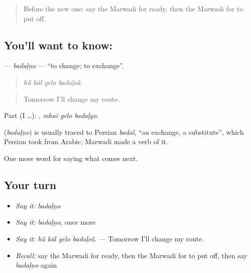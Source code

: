 \label{lesson:MW-C220-badalno}



\begin{quote}
Before the new one: say the Marwadi for ready, then the Marwadi for to put off.
\end{quote}

\subsection*{You'll want to know: }
\textbf{} — \emph{badaḷṇo} — \textquotedblleft{}to change; to exchange\textquotedblright{}.

\begin{quote}
   
\end{quote}

\begin{quote}
\emph{hū̃ kāl gelo badaḷsū̃.}
\end{quote}

\begin{quote}
Tomorrow I'll change my route.
\end{quote}

Past (I …):   , \emph{mhaĩ gelo badaḷyo}.

\begin{cousinweb}
\textbf{} (\emph{badaḷṇo}) is usually traced to Persian \emph{badal}, \textquotedblleft{}an exchange, a substitute\textquotedblright{}, which Persian took from Arabic; Marwadi made a verb of it.
\end{cousinweb}

\begin{grammarlens}[title={What you've built}]
One more word for saying what comes next.
\end{grammarlens}

\subsection*{Your turn}
\begin{itemize}
\raggedright
  \item \emph{Say it:} \emph{badaḷṇo}
  \item \emph{Say it:} \emph{badaḷṇo}, once more
  \item \emph{Say it:} \emph{hū̃ kāl gelo badaḷsū̃.} — Tomorrow I'll change my route.
  \item \emph{Recall:} say the Marwadi for ready, then the Marwadi for to put off, then say \emph{badaḷṇo} again
\end{itemize}

